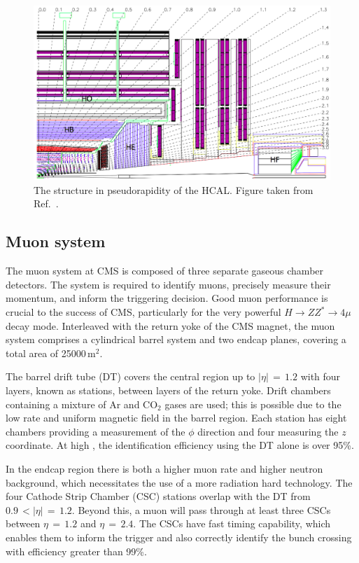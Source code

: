 \begin{figure}[h!]
  \centering
  \includegraphics[width=\textwidth]{Figures/Detector/HCAL.png}
  \caption[The structure in pseudorapidity of the CMS HCAL.]
  {The structure in pseudorapidity of the HCAL.
  Figure taken from Ref.~\cite{CMSdetector}.}
  \label{fig:detector_HCAL}
\end{figure}

\subsection{Muon system}

The muon system at CMS is composed of three separate gaseous chamber detectors.
The system is required to identify muons, precisely measure their momentum, and inform the triggering decision.
Good muon performance is crucial to the success of CMS, particularly for the very powerful $H \rightarrow ZZ^* \rightarrow 4\mu$ decay mode.
Interleaved with the return yoke of the CMS magnet, the muon system comprises a cylindrical barrel system and two endcap planes, 
covering a total area of 25000\,$\textrm{m}^2$.

The barrel drift tube (DT) covers the central region up to $|\eta|\,=\,1.2$ with four layers, known as stations, between layers of the return yoke.
Drift chambers containing a mixture of Ar and $\textrm{CO}_2$ gases are used; this is possible due to the low rate and uniform magnetic field in the barrel region.
Each station has eight chambers providing a measurement of the $\phi$ direction and four measuring the $z$ coordinate.
At high \pt, the identification efficiency using the DT alone is over 95\%.

In the endcap region there is both a higher muon rate and higher neutron background, which necessitates the use of a more radiation hard technology. %
The four Cathode Strip Chamber (CSC) stations overlap with the DT from $0.9\,<|\eta|\,=\,1.2$.
Beyond this, a muon will pass through at least three CSCs between $\eta\,=\,1.2$ and $\eta\,=\,2.4$.
The CSCs have fast timing capability, which enables them to inform the trigger and also correctly identify the bunch crossing with efficiency greater than 99\%.

